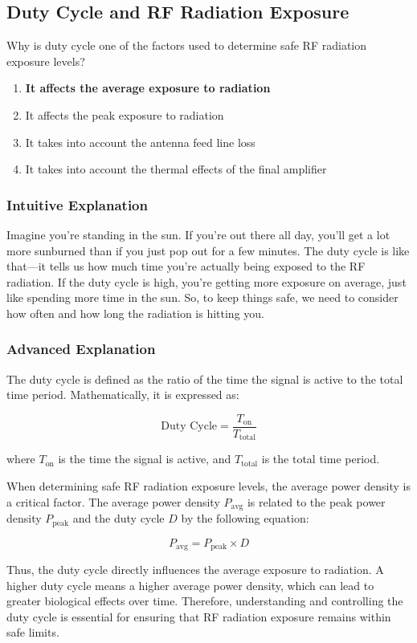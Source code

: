 \subsection{Duty Cycle and RF Radiation Exposure}
\label{T0C10}

\begin{tcolorbox}[colback=gray!10!white,colframe=black!75!black,title=T0C10]
Why is duty cycle one of the factors used to determine safe RF radiation exposure levels?
\begin{enumerate}[label=\Alph*)]
    \item \textbf{It affects the average exposure to radiation}
    \item It affects the peak exposure to radiation
    \item It takes into account the antenna feed line loss
    \item It takes into account the thermal effects of the final amplifier
\end{enumerate}
\end{tcolorbox}

\subsubsection{Intuitive Explanation}
Imagine you're standing in the sun. If you're out there all day, you'll get a lot more sunburned than if you just pop out for a few minutes. The duty cycle is like that—it tells us how much time you're actually being exposed to the RF radiation. If the duty cycle is high, you're getting more exposure on average, just like spending more time in the sun. So, to keep things safe, we need to consider how often and how long the radiation is hitting you.

\subsubsection{Advanced Explanation}
The duty cycle is defined as the ratio of the time the signal is active to the total time period. Mathematically, it is expressed as:

\[
\text{Duty Cycle} = \frac{T_{\text{on}}}{T_{\text{total}}}
\]

where \( T_{\text{on}} \) is the time the signal is active, and \( T_{\text{total}} \) is the total time period. 

When determining safe RF radiation exposure levels, the average power density is a critical factor. The average power density \( P_{\text{avg}} \) is related to the peak power density \( P_{\text{peak}} \) and the duty cycle \( D \) by the following equation:

\[
P_{\text{avg}} = P_{\text{peak}} \times D
\]

Thus, the duty cycle directly influences the average exposure to radiation. A higher duty cycle means a higher average power density, which can lead to greater biological effects over time. Therefore, understanding and controlling the duty cycle is essential for ensuring that RF radiation exposure remains within safe limits.

